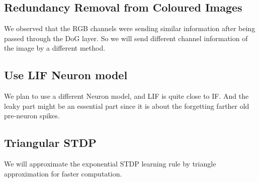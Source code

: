 \documentclass[conference]{IEEEtran}
\begin{document}
\subsection{Redundancy Removal from Coloured Images}
We observed that the RGB channels were sending similar information after being passed through the DoG layer. So we will send different channel information of the image by a different method.

\subsection{Use LIF Neuron model}
We plan to use a different Neuron model, and LIF is quite close to IF. And the leaky part might be an essential part since it is about the forgetting farther old pre-neuron spikes.

\subsection{Triangular STDP}
We will approximate the exponential STDP learning rule by triangle approximation for faster computation.



\end{document}
